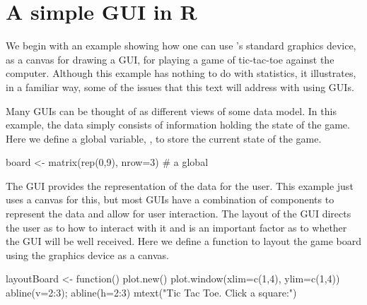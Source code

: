 \section{A simple GUI in R}
\label{sec:GUI:tic-tac-toe}

We begin with an example showing how one can use \R's standard
graphics device, as a canvas for drawing a GUI, for playing a game of
tic-tac-toe against the computer. Although this example
has nothing to do with statistics, it illustrates, in a familiar way,
some of the issues that this text will address with using GUIs. 



Many GUIs can be thought of as different views of some data
model. 
In this example, the data simply consists of information holding the
state of the game. Here we define a global variable, , to store the
current state of the game. 

\begin{Schunk}
\begin{Sinput}
 board <- matrix(rep(0,9), nrow=3)       # a global
\end{Sinput}
\end{Schunk}

The GUI provides the representation of the data for the user. This
example just uses a canvas for this, but most GUIs have a combination
of components to represent the data and allow for user
interaction. The layout of the GUI directs the user as to how to
interact with it and is an important factor as to whether the GUI will
be well received. Here we define a function to layout the game board
using the graphics device as a canvas.

\begin{Schunk}
\begin{Sinput}
 layoutBoard <- function() {
   plot.new()
   plot.window(xlim=c(1,4), ylim=c(1,4))
   abline(v=2:3);  abline(h=2:3)
   mtext("Tic Tac Toe. Click a square:")
 }
\end{Sinput}
\end{Schunk}

